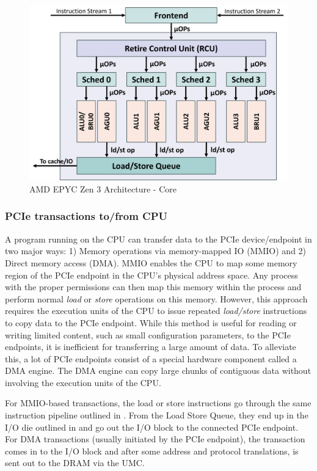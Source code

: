 \begin{figure}[!htb]
    \centering
    \includegraphics[width=\columnwidth]{figures/background/amd_arch/core.png}
    \caption{AMD EPYC Zen 3 Architecture - Core}
    \label{fig:amd-core}
\end{figure}

\subsubsection{PCIe transactions to/from CPU}

A program running on the CPU can transfer data to the PCIe device/endpoint in two major ways: 1) Memory operations via memory-mapped IO (MMIO) and 2) Direct memory access (DMA).
MMIO enables the CPU to map some memory region of the PCIe endpoint in the CPU's physical address space.
Any process with the proper permissions can then map this memory within the process and perform normal \textit{load} or \textit{store} operations on this memory.
However, this approach requires the execution units of the CPU to issue repeated \textit{load/store} instructions to copy data to the PCIe endpoint.
While this method is useful for reading or writing limited content, such as small configuration parameters, to the PCIe endpoints, it is inefficient for transferring a large amount of data.
To alleviate this, a lot of PCIe endpoints consist of a special hardware component called a DMA engine.
The DMA engine can copy large chunks of contiguous data without involving the execution units of the CPU.

For MMIO-based transactions, the load or store instructions go through the same instruction pipeline outlined in . 
From the Load Store Queue, they end up in the I/O die outlined in  and go out the I/O block to the connected PCIe endpoint.
For DMA transactions (usually initiated by the PCIe endpoint), the transaction comes in to the I/O block and after some address and protocol translations, is sent out to the DRAM via the UMC.

\endinput

